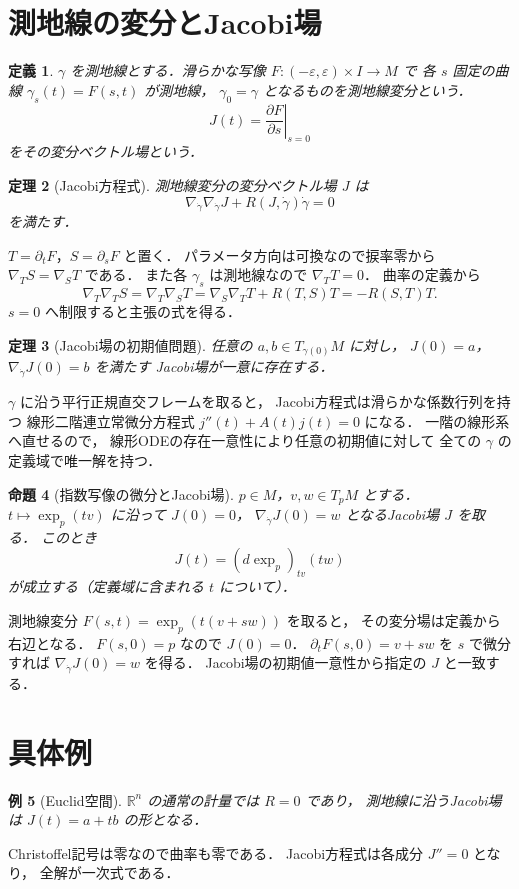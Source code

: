 \documentclass[a5paper,10pt,onecolumn]{jsarticle}
\makeatletter
\theoremstyle{mathnotetheorem}
\newtheorem{theorem}{定理}[section]
\newtheorem{definition}[theorem]{定義}
\newtheorem{proposition}[theorem]{命題}
\newtheorem{example}[theorem]{例}
\renewcommand{\proofname}{証明}
\renewenvironment{proof}[1][\proofname]{%
  \par\pushQED{\qed}\normalfont\topsep4\p@\@plus2\p@\relax
  \trivlist\item[\hskip\labelsep\bfseries #1]\ignorespaces
}{\popQED\endtrivlist\@endpefalse}
\makeatother
\begin{document}
\section{測地線の変分とJacobi場}
\begin{definition}
$\gamma$ を測地線とする．滑らかな写像
$F:(-\varepsilon,\varepsilon)\times I\to M$ で
各 $s$ 固定の曲線 $\gamma_s(t)=F(s,t)$ が測地線，
$\gamma_0=\gamma$ となるものを測地線変分という．
\[
 J(t)=\left.\frac{\partial F}{\partial s}\right|_{s=0}
\]
をその変分ベクトル場という．
\end{definition}
\begin{theorem}[Jacobi方程式]\label{thm:jacobi}
測地線変分の変分ベクトル場 $J$ は
\[
 \nabla_{\dot\gamma}\nabla_{\dot\gamma}J
 +R(J,\dot\gamma)\dot\gamma=0
\]
を満たす．
\end{theorem}
\begin{proof}
$T=\partial_tF$，$S=\partial_sF$ と置く．
パラメータ方向は可換なので捩率零から
$\nabla_TS=\nabla_ST$ である．
また各 $\gamma_s$ は測地線なので
$\nabla_TT=0$．
曲率の定義から
\[
 \nabla_T\nabla_TS
 =\nabla_T\nabla_ST
 =\nabla_S\nabla_TT+R(T,S)T
 =-R(S,T)T.
\]
$s=0$ へ制限すると主張の式を得る．
\end{proof}
\begin{theorem}[Jacobi場の初期値問題]
任意の $a,b\in T_{\gamma(0)}M$ に対し，
$J(0)=a$，
$\nabla_{\dot\gamma}J(0)=b$ を満たす
Jacobi場が一意に存在する．
\end{theorem}
\begin{proof}
$\gamma$ に沿う平行正規直交フレームを取ると，
Jacobi方程式は滑らかな係数行列を持つ
線形二階連立常微分方程式
$j''(t)+A(t)j(t)=0$ になる．
一階の線形系へ直せるので，
線形ODEの存在一意性により任意の初期値に対して
全ての $\gamma$ の定義域で唯一解を持つ．
\end{proof}
\begin{proposition}[指数写像の微分とJacobi場]
$p\in M$，$v,w\in T_pM$ とする．
$t\mapsto\exp_p(tv)$ に沿って
$J(0)=0$，
$\nabla_{\dot\gamma}J(0)=w$ となるJacobi場 $J$ を取る．
このとき
\[
 J(t)=(d\exp_p)_{tv}(tw)
\]
が成立する（定義域に含まれる $t$ について）．
\end{proposition}
\begin{proof}
測地線変分
$F(s,t)=\exp_p(t(v+sw))$ を取ると，
その変分場は定義から右辺となる．
$F(s,0)=p$ なので $J(0)=0$．
$\partial_tF(s,0)=v+sw$ を $s$ で微分すれば
$\nabla_{\dot\gamma}J(0)=w$ を得る．
Jacobi場の初期値一意性から指定の $J$ と一致する．
\end{proof}
\section{具体例}
\begin{example}[Euclid空間]
$\mathbb R^n$ の通常の計量では $R=0$ であり，
測地線に沿うJacobi場は $J(t)=a+tb$ の形となる．
\end{example}
\begin{proof}
Christoffel記号は零なので曲率も零である．
Jacobi方程式は各成分 $J''=0$ となり，
全解が一次式である．
\end{proof}
\end{document}
